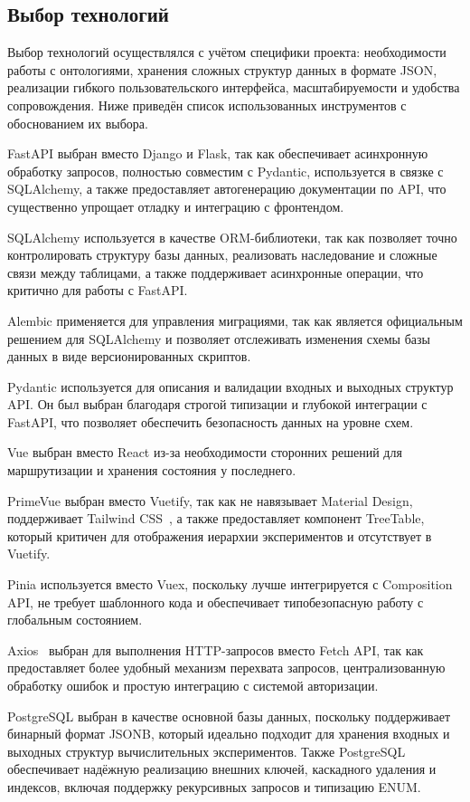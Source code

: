 \subsection{Выбор технологий}

Выбор технологий осуществлялся с учётом специфики проекта: необходимости работы с онтологиями, хранения сложных структур данных в формате JSON, реализации гибкого пользовательского интерфейса, масштабируемости и удобства сопровождения.
Ниже приведён список использованных инструментов с обоснованием их выбора.

FastAPI выбран вместо Django и Flask, так как обеспечивает асинхронную обработку запросов, полностью совместим с Pydantic, используется в связке с SQLAlchemy, а также предоставляет автогенерацию документации по API, что существенно упрощает отладку и интеграцию с фронтендом.

SQLAlchemy используется в качестве ORM-библиотеки, так как позволяет точно контролировать структуру базы данных, реализовать наследование и сложные связи между таблицами, а также поддерживает асинхронные операции, что критично для работы с FastAPI.

Alembic применяется для управления миграциями, так как является официальным решением для SQLAlchemy и позволяет отслеживать изменения схемы базы данных в виде версионированных скриптов.

Pydantic используется для описания и валидации входных и выходных структур API. Он был выбран благодаря строгой типизации и глубокой интеграции с FastAPI, что позволяет обеспечить безопасность данных на уровне схем.

Vue выбран вместо React из-за необходимости сторонних решений для маршрутизации и хранения состояния у последнего.

PrimeVue выбран вместо Vuetify, так как не навязывает Material Design, поддерживает Tailwind CSS~\cite{Library:TailwindCSS}, а также предоставляет компонент TreeTable, который критичен для отображения иерархии экспериментов и отсутствует в Vuetify.

Pinia используется вместо Vuex, поскольку лучше интегрируется с Composition API, не требует шаблонного кода и обеспечивает типобезопасную работу с глобальным состоянием.

Axios~\cite{Library:Axios} выбран для выполнения HTTP-запросов вместо Fetch API, так как предоставляет более удобный механизм перехвата запросов, централизованную обработку ошибок и простую интеграцию с системой авторизации.

PostgreSQL выбран в качестве основной базы данных, поскольку поддерживает бинарный формат JSONB, который идеально подходит для хранения входных и выходных структур вычислительных экспериментов. Также PostgreSQL обеспечивает надёжную реализацию внешних ключей, каскадного удаления и индексов, включая поддержку рекурсивных запросов и типизацию ENUM.

